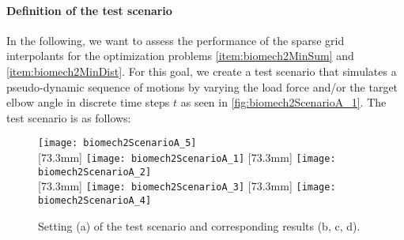 \paragraph{Definition of the test scenario}

In the following, we want to assess the performance
of the sparse grid interpolants for the optimization problems
\ref{item:biomech2MinSum} and \ref{item:biomech2MinDist}.
For this goal, we create a test scenario \cite{Valentin18Gradient}
that simulates a pseudo-dynamic sequence of motions
by varying the load force and/or the target elbow angle
in discrete time steps $t$ as seen in \cref{fig:biomech2ScenarioA_1}.
The test scenario is as follows:
%
\begin{figure}
  \texttt{[image: biomech2ScenarioA\_5]}%
  \\[2mm]%
  [73.3mm]{%
    \hspace*{4.5mm}%
    \texttt{[image: biomech2ScenarioA\_1]}%
    \hspace*{2.4mm}%
  }%
  \hfill%
  [73.3mm]{%
    \hspace*{0.0mm}%
    \texttt{[image: biomech2ScenarioA\_2]}%
    \hspace*{9.8mm}%
  }%
  \\[1mm]%
  [73.3mm]{%
    \texttt{[image: biomech2ScenarioA\_3]}%
  }%
  \hfill%
  [73.3mm]{%
    \texttt{[image: biomech2ScenarioA\_4]}%
  }%
  \caption[Settings and results of the test scenario]{%
    Setting (a) of the test scenario and corresponding results (b, c, d).%
  }%
  \label{fig:biomech2ScenarioA}%
\end{figure}
%

